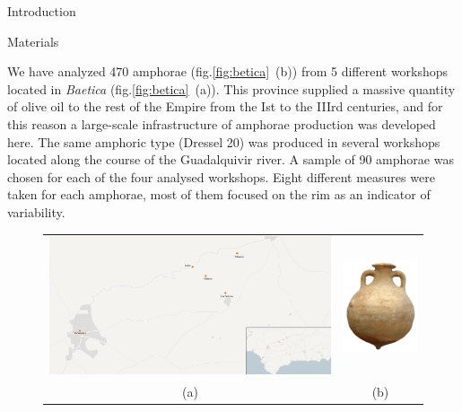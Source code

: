 \documentclass[final]{beamer}
\newcommand{\memo}[2]{\textcolor{#1}{#2}}
\newcommand{\xavi}[1]{\memo{orange}{#1\\}}
\newlength{\onecolwid}
\begin{document}
\begin{frame}[t]
\begin{columns}[t]
\begin{column}{\onecolwid}
\begin{block}{Introduction}
\end{block}

\vspace{-0.5cm}

\begin{block}{Materials}

\justify
We have analyzed 470 amphorae (fig.\ref{fig:betica}~(b)) from 5 different workshops located in \emph{Baetica} (fig.\ref{fig:betica}~(a)). This province supplied a massive quantity of olive oil to the rest of the Empire from the Ist to the IIIrd centuries, and for this reason a large-scale infrastructure of amphorae production was developed here. The same amphoric type (Dressel 20) was produced in several workshops located along the course of the Guadalquivir river. A sample of 90 amphorae was chosen for each of the four analysed workshops. Eight different measures were taken for each amphorae, most of them focused on the rim as an indicator of variability. 



\begin{figure}
\begin{tabular}{cc}


\includegraphics[width=0.7\linewidth]{images/fig1.png} &
\includegraphics[width=0.2\linewidth]{images/amphorae.png} \\
(a) & (b)
\end{tabular}


\end{figure}
\end{block}
\end{column}
\end{columns}
\end{frame}
\end{document}
